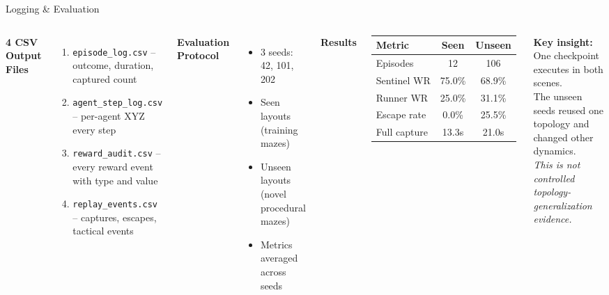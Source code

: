 \documentclass[aspectratio=169,11pt]{beamer}
\begin{document}
\begin{frame}{Logging \& Evaluation}
\begin{columns}[T]
\textbf{4 CSV Output Files}
\begin{enumerate}
\item \texttt{episode\_log.csv} -- outcome, duration, captured count
\item \texttt{agent\_step\_log.csv} -- per-agent XYZ every step
\item \texttt{reward\_audit.csv} -- every reward event with type and value
\item \texttt{replay\_events.csv} -- captures, escapes, tactical events
\end{enumerate}

\vspace{6pt}
\textbf{Evaluation Protocol}
\begin{itemize}
\item 3 seeds: 42, 101, 202
\item Seen layouts (training mazes)
\item Unseen layouts (novel procedural mazes)
\item Metrics averaged across seeds
\end{itemize}

\textbf{Results}
\begin{tabular}{@{}lcc@{}}
\toprule
Metric & Seen & Unseen \\
\midrule
Episodes & 12 & 106 \\
Sentinel WR & 75.0\% & 68.9\% \\
Runner WR & 25.0\% & 31.1\% \\
Escape rate & 0.0\% & 25.5\% \\
Full capture & 13.3s & 21.0s \\
\bottomrule
\end{tabular}

\vspace{6pt}
\textbf{Key insight:}\\
One checkpoint executes in both scenes.\\
The unseen seeds reused one topology and changed other dynamics.\\
\textit{This is not controlled topology-generalization evidence.}
\end{columns}
\end{frame}
\end{document}
